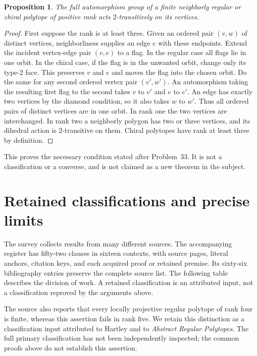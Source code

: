 \documentclass[11pt,a4paper]{article}
\newtheorem{proposition}[theorem]{Proposition}
\begin{document}
\begin{proposition}\label{neighborly}
The full automorphism group of a finite neighborly regular
or chiral polytope of positive rank acts $2$-transitively on its vertices.
\end{proposition}
\begin{proof}
First suppose the rank is at least three. Given an ordered
pair $(v,w)$ of distinct vertices, neighborliness supplies
an edge $e$ with these endpoints. Extend the incident
vertex-edge pair $(v,e)$ to a flag. In the regular case
all flags lie in one orbit. In the chiral case, if the flag
is in the unwanted orbit, change only its type-$2$ face.
This preserves $v$ and $e$ and moves the flag into the
chosen orbit. Do the same for any second ordered vertex
pair $(v',w')$. An automorphism taking the resulting first
flag to the second takes $v$ to $v'$ and $e$ to $e'$.
An edge has exactly two vertices by the diamond condition,
so it also takes $w$ to $w'$. Thus all ordered pairs of
distinct vertices are in one orbit. In rank one the two
vertices are interchanged. In rank two a neighborly
polygon has two or three vertices, and its dihedral
action is $2$-transitive on them. Chiral polytopes have
rank at least three by definition.
\end{proof}
This proves the necessary condition stated after Problem~33.
It is not a classification or a converse, and is not
claimed as a new theorem in the subject.

\section{Retained classifications and precise limits}

The survey collects results from many different sources.
The accompanying register has fifty-two clauses in sixteen
contexts, with source pages, literal anchors, citation keys,
and each acquired proof or retained premise. Its sixty-six
bibliography entries preserve the complete source list.
The following table describes the division of work. A
retained classification is an attributed input, not a
classification reproved by the arguments above.



The source also reports that every locally projective
regular polytope of rank four is finite, whereas this
assertion fails in rank five. We retain this distinction
as a classification input attributed to Hartley and to
\emph{Abstract Regular Polytopes}. The full primary
classification has not been independently inspected;
the common proofs above do not establish this assertion.
\end{document}
